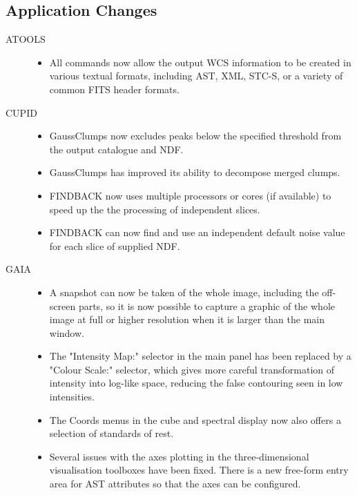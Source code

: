 \documentclass[11pt,twoside]{article}
\begin{document}
\subsection{Application Changes}
\begin{description}

\item[ATOOLS] \hfill
\begin{itemize}
\item All commands now allow the output WCS information to be created
in various textual formats, including AST, XML, STC-S, or a variety of
common FITS header formats.
\end{itemize}

\item[CUPID] \hfill
\begin{itemize}
\item GaussClumps now excludes peaks below the specified threshold from the output catalogue and NDF.
\item GaussClumps has improved its ability to decompose merged clumps.
\item FINDBACK now uses multiple processors or cores (if available) to speed up the the processing of independent slices.
\item FINDBACK can now find and use an independent default noise value for each slice of supplied NDF.
\end{itemize}

\item[GAIA] \hfill
\begin{itemize}
\item A snapshot can now be taken of the whole image, including the off-screen parts, so it is now possible to capture a graphic of the whole image at full or higher resolution when it is larger than the main window.
\item The "Intensity Map:" selector in the main panel has been replaced by a "Colour Scale:" selector, which gives more careful transformation of intensity into log-like space, reducing the false contouring seen in low intensities.
\item The Coords menus in the cube and spectral display now also offers a selection of standards of rest.
\item Several issues with the axes plotting in the three-dimensional visualisation toolboxes have been fixed. There is a new free-form entry area for AST attributes so that the axes can be configured.
\end{itemize}


\end{description}
\end{document}
